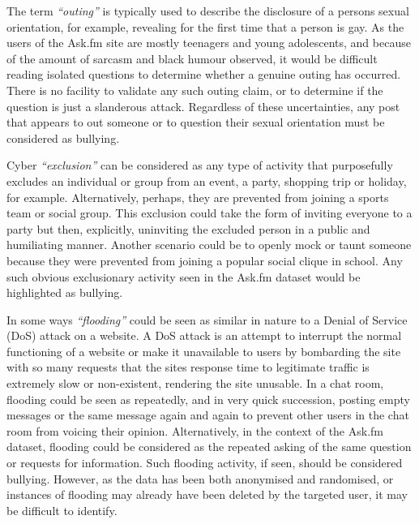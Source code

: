 The  term \textit{``outing''} is typically used to describe the disclosure of a persons sexual orientation, for example, revealing for the first time that a person is gay. As the users of the Ask.fm site are mostly teenagers and young adolescents, and because of the amount of sarcasm and black humour observed, it would be difficult reading isolated questions to determine whether a genuine outing has occurred. There is no facility to validate any such outing claim, or to determine if the question is just a slanderous attack. Regardless of these uncertainties, any post that appears to out someone or to question their sexual orientation must be considered as bullying.

Cyber \textit{``exclusion''} can be considered as any type of activity that purposefully excludes an individual or group from an event, a party, shopping trip or holiday, for example.  Alternatively, perhaps, they are prevented from joining a sports team or social group. This exclusion could take the form of inviting everyone to a party but then, explicitly, uninviting the excluded person in a public and humiliating manner. Another scenario could be to openly mock or taunt someone because they were prevented from joining a popular social clique in school. Any such obvious exclusionary activity seen in the Ask.fm dataset would be highlighted as bullying.

In some ways \textit{``flooding''} could be seen as similar in nature to a Denial of Service (DoS) attack on a website. A DoS attack is an attempt to interrupt the normal functioning of a website or make it unavailable to users by bombarding the site with so many requests that the sites response time to legitimate traffic is extremely slow or non-existent, rendering the site unusable. In a chat room, flooding could be seen as repeatedly, and in very quick succession, posting empty messages or the same message again and again to prevent other users in the chat room from voicing their opinion. Alternatively, in the context of the Ask.fm dataset, flooding could be considered as the repeated asking of the same question or requests for information. Such flooding activity, if seen, should be considered bullying. However, as the data has been both anonymised and randomised, or instances of flooding may already have been deleted by the targeted user, it may be difficult to identify.


